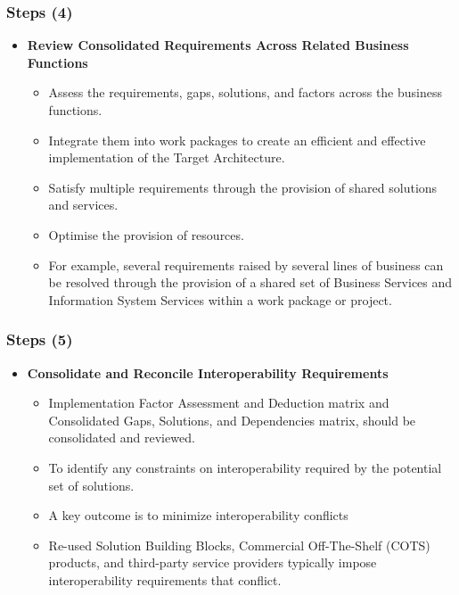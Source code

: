 \documentclass[aspectratio=169, table]{beamer}
\begin{document}
	\begin{frame}
		\frametitle{Steps (4)}
		\vspace{20pt}
		\begin{itemize}
			\item \textbf{Review Consolidated Requirements Across Related Business Functions}
			\begin{itemize}
				\item Assess the requirements, gaps, solutions, and factors across the business functions.
				\item Integrate them into work packages to create an
				efficient and effective implementation of the Target Architecture. 
				\item Satisfy multiple requirements through the provision of shared solutions and services. 
				\item Optimise the provision of resources. 
				\item For example, several
				requirements raised by several lines of business can be resolved through
				the provision of a shared set of Business Services and Information System
				Services within a work package or project.
				
			\end{itemize}
		\end{itemize}
	\end{frame}

	\begin{frame}
		\frametitle{Steps (5)}
		\vspace{20pt}
		\begin{itemize}
			\item \textbf{Consolidate and Reconcile Interoperability Requirements}
			\begin{itemize}
				\item Implementation Factor Assessment and Deduction matrix and Consolidated
				Gaps, Solutions, and Dependencies matrix, should be consolidated and
				reviewed.
				\item To identify any constraints on interoperability required by the
				potential set of solutions. 
				\item A key outcome is to minimize interoperability conflicts
				\item Re-used Solution Building Blocks, Commercial Off-The-Shelf
				(COTS) products, and third-party service providers typically impose
				interoperability requirements that conflict.
			\end{itemize}
		\end{itemize}
	\end{frame}
\end{document}
